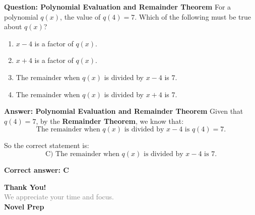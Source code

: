 \documentclass{beamer}
\begin{document}
\begin{frame}{\textbf{Question: Polynomial Evaluation and Remainder Theorem}}
For a polynomial $q(x)$, the value of $q(4) = 7$.  
Which of the following must be true about $q(x)$?
\vspace{1em}

\begin{enumerate}
\item[A] $x - 4$ is a factor of $q(x)$.
\item[B] $x + 4$ is a factor of $q(x)$.
\item[C] The remainder when $q(x)$ is divided by $x - 4$ is $7$.
\item[D] The remainder when $q(x)$ is divided by $x + 4$ is $7$.
\end{enumerate}
\end{frame}


\begin{frame}{\textbf{Answer: Polynomial Evaluation and Remainder Theorem}}
Given that $q(4) = 7$, by the \textbf{Remainder Theorem}, we know that:
\[
\text{The remainder when } q(x) \text{ is divided by } x - 4 \text{ is } q(4) = 7.
\]

So the correct statement is:
\[
\boxed{\text{C) The remainder when } q(x) \text{ is divided by } x - 4 \text{ is } 7.}
\]

\bigskip
\textbf{Correct answer: C}
\end{frame}













\begin{frame}{}

    \centering
    \vspace{5em}

    {\Huge \textbf{\textcolor{novelPurple}{Thank You!}}} \\[1em]
    {\large \textcolor{gray}{We appreciate your time and focus.}} \\[3em]

    {\LARGE \textbf{\textcolor{novelPurple}{\textsf{Novel Prep}}}}

    \vfill
\end{frame}
\end{document}
